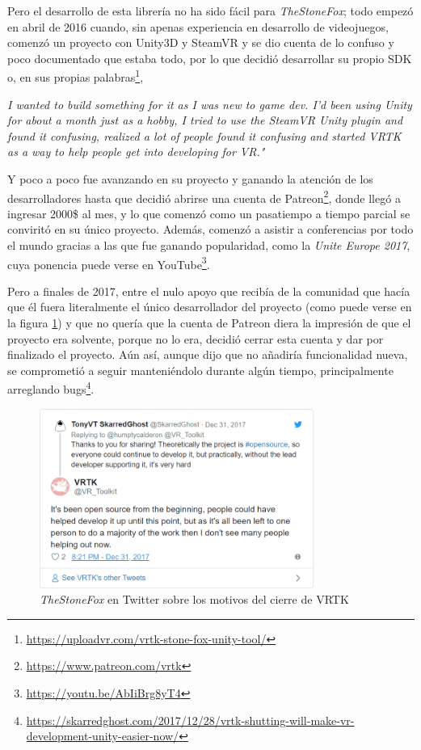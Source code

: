 Pero el desarrollo de esta librería no ha sido fácil para \textit{TheStoneFox}; todo empezó en abril de 2016 cuando, sin apenas experiencia en desarrollo de videojuegos, comenzó un proyecto con Unity3D y SteamVR y se dio cuenta de lo confuso y poco documentado que estaba todo, por lo que decidió desarrollar su propio \acs{SDK} o, en sus propias palabras\footnote{\url{https://uploadvr.com/vrtk-stone-fox-unity-tool/}},

\begin{displayquote}
\textit{I wanted to build something for it as I was new to game dev. I’d been using Unity for about a month just as a hobby, I tried to use the SteamVR Unity plugin and found it confusing, realized a lot of people found it confusing and started VRTK as a way to help people get into developing for VR."}
\end{displayquote}

Y poco a poco fue avanzando en su proyecto y ganando la atención de los desarrolladores hasta que decidió abrirse una cuenta de Patreon\footnote{\url{https://www.patreon.com/vrtk}}, donde llegó a ingresar 2000\$ al mes, y lo que comenzó como un pasatiempo a tiempo parcial se conviritó en su único proyecto. Además, comenzó a asistir a conferencias por todo el mundo gracias a las que fue ganando popularidad, como la \textit{Unite Europe 2017}, cuya ponencia puede verse en YouTube\footnote{\url{https://youtu.be/AbIiBrg8yT4}}.

Pero a finales de 2017, entre el nulo apoyo que recibía de la comunidad que hacía que él fuera literalmente el único desarrollador del proyecto (como puede verse en la figura \ref{fig:stonefox-twitter}) y que no quería que la cuenta de Patreon diera la impresión de que el proyecto era solvente, porque no lo era, decidió cerrar esta cuenta y dar por finalizado el proyecto. Aún así, aunque dijo que no añadiría funcionalidad nueva, se comprometió a seguir manteniéndolo durante algún tiempo, principalmente arreglando bugs\footnote{\url{https://skarredghost.com/2017/12/28/vrtk-shutting-will-make-vr-development-unity-easier-now/}}.

\begin{figure}[!h]
\begin{center}
\includegraphics[width=0.8\textwidth]{imagenes/2/stonefox-twitter.png}
\caption{\textit{TheStoneFox} en Twitter sobre los motivos del cierre de \acs{VRTK}}
\label{fig:stonefox-twitter}
\end{center}
\end{figure}

